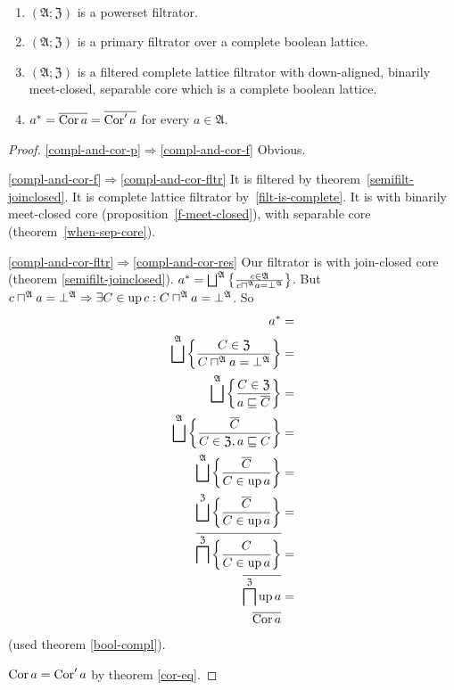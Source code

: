 \begin{thm}\label{compl-and-cor}
~
\begin{enumerate}
\item \label{compl-and-cor-p}$(\mathfrak{A};\mathfrak{Z})$ is a powerset filtrator.
\item \label{compl-and-cor-f}$(\mathfrak{A};\mathfrak{Z})$ is a primary filtrator over a complete boolean lattice.
\item \label{compl-and-cor-fltr}$(\mathfrak{A};\mathfrak{Z})$ is a filtered
complete lattice filtrator with down-aligned, binarily meet-closed,
separable core which is a complete boolean lattice.
\item \label{compl-and-cor-res} $a^{\ast}=\overline{\operatorname{Cor} a}=\overline{\operatorname{Cor}'a}$
for every $a\in\mathfrak{A}$.
\end{enumerate}
\end{thm}
\begin{proof}
\item [\ref{compl-and-cor-p}$\Rightarrow$\ref{compl-and-cor-f}] Obvious.
\item [\ref{compl-and-cor-f}$\Rightarrow$\ref{compl-and-cor-fltr}]
It is filtered by theorem~\ref{semifilt-joinclosed}. It is complete lattice filtrator by~\ref{filt-is-complete}.
It is with binarily meet-closed core (proposition~\ref{f-meet-closed}),
with separable core (theorem~\ref{when-sep-core}).
\item [\ref{compl-and-cor-fltr}$\Rightarrow$\ref{compl-and-cor-res}]
Our filtrator is with join-closed core (theorem \ref{semifilt-joinclosed}).
$a^{\ast}=\bigsqcup^{\mathfrak{A}}\left\{ \frac{c\in\mathfrak{A}}{c\sqcap^{\mathfrak{A}}a=\bot^{\mathfrak{A}}}\right\}$.
But $c\sqcap^{\mathfrak{A}}a=\bot^{\mathfrak{A}}\Rightarrow\exists C\in\operatorname{up} c:C\sqcap^{\mathfrak{A}}a=\bot^{\mathfrak{A}}$.
So
\begin{align*}
a^{\ast} & =\\
\bigsqcup^{\mathfrak{A}}\left\{ \frac{C\in\mathfrak{Z}}{C\sqcap^{\mathfrak{A}}a=\bot^{\mathfrak{A}}}\right\} & =\\
\bigsqcup^{\mathfrak{A}}\left\{ \frac{C\in\mathfrak{Z}}{a\sqsubseteq\overline{C}}\right\} & =\\
\bigsqcup^{\mathfrak{A}}\left\{ \frac{\overline{C}}{C\in\mathfrak{Z},a\sqsubseteq C}\right\} & =\\
\bigsqcup^{\mathfrak{A}}\left\{ \frac{\overline{C}}{C\in\operatorname{up} a}\right\} & =\\
\bigsqcup^{\mathfrak{Z}}\left\{ \frac{\overline{C}}{C\in\operatorname{up} a}\right\} & =\\
\overline{\bigsqcap^{\mathfrak{Z}}\left\{ \frac{C}{C\in\operatorname{up} a}\right\}} & =\\
\overline{\bigsqcap^{\mathfrak{Z}}\operatorname{up} a} & =\\
\overline{\operatorname{Cor} a}
\end{align*}
(used theorem \ref{bool-compl}).

$\operatorname{Cor} a=\operatorname{Cor}'a$ by theorem \ref{cor-eq}.\end{proof}
